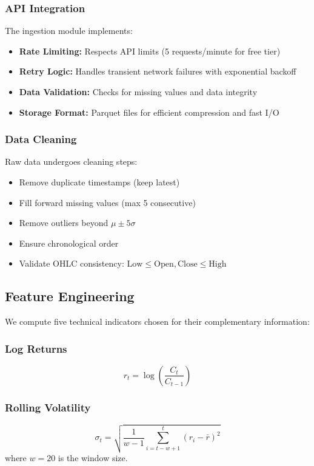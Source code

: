 \documentclass[conference]{IEEEtran}
\begin{document}
\subsubsection{API Integration}
The ingestion module implements:
\begin{itemize}
\item \textbf{Rate Limiting:} Respects API limits (5 requests/minute for free tier)
\item \textbf{Retry Logic:} Handles transient network failures with exponential backoff
\item \textbf{Data Validation:} Checks for missing values and data integrity
\item \textbf{Storage Format:} Parquet files for efficient compression and fast I/O
\end{itemize}

\subsubsection{Data Cleaning}
Raw data undergoes cleaning steps:
\begin{itemize}
\item Remove duplicate timestamps (keep latest)
\item Fill forward missing values (max 5 consecutive)
\item Remove outliers beyond $\mu \pm 5\sigma$
\item Ensure chronological order
\item Validate OHLC consistency: $\text{Low} \leq \text{Open}, \text{Close} \leq \text{High}$
\end{itemize}

\subsection{Feature Engineering}

We compute five technical indicators chosen for their complementary information:

\subsubsection{Log Returns}
\begin{equation}
r_t = \log\left(\frac{C_t}{C_{t-1}}\right)
\end{equation}

\subsubsection{Rolling Volatility}
\begin{equation}
\sigma_t = \sqrt{\frac{1}{w-1}\sum_{i=t-w+1}^{t}(r_i - \bar{r})^2}
\end{equation}
where $w=20$ is the window size.
\end{document}

